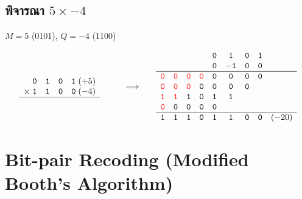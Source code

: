 \documentclass[12pt]{article}
\newcommand{\bit}[1]{\mathtt{#1}}
\newcommand{\rbit}[1]{\textcolor{red}{\mathtt{#1}}}
\newcommand{\coef}[1]{\mathtt{#1}}
\newcommand{\blank}{\phantom{\bit{0}}}
\begin{document}
\subsection{พิจารณา $5 \times -4$}
$M = 5$ (0101), $Q = -4$ (1100)

\[
\begin{array}{cc@{\qquad\Longrightarrow\qquad}c}
\begin{array}{c@{\;}cccc@{\;}l}
\phantom{\times}&\bit{0}&\bit{1}&\bit{0}&\bit{1}&(+5)\\
\times&\bit{1}&\bit{1}&\bit{0}&\bit{0}&(-4)\\
\hline
\end{array}
& &
\begin{array}{*{8}{c}l}
\blank&\blank&\blank&\blank&\bit{0}&\bit{1}&\bit{0}&\bit{1}&\\
\blank&\blank&\blank&\blank&\coef{0}&\coef{-1}&\coef{0}&\coef{0}&\\
\hline
\rbit{0}&\rbit{0}&\rbit{0}&\rbit{0}&\bit{0}&\bit{0}&\bit{0}&\bit{0}&\\
\rbit{0}&\rbit{0}&\rbit{0}&\bit{0}&\bit{0}&\bit{0}&\bit{0}&\blank&\\
\rbit{1}&\rbit{1}&\bit{1}&\bit{0}&\bit{1}&\bit{1}&\blank&\blank&\\
\rbit{0}&\bit{0}&\bit{0}&\bit{0}&\bit{0}&\blank&\blank&\blank&\\
\hline
\bit{1}&\bit{1}&\bit{1}&\bit{0}&\bit{1}&\bit{1}&\bit{0}&\bit{0}&(-20)
\end{array}
\end{array}
\]

\newpage
\section{Bit-pair Recoding (Modified Booth's Algorithm)}
\end{document}
